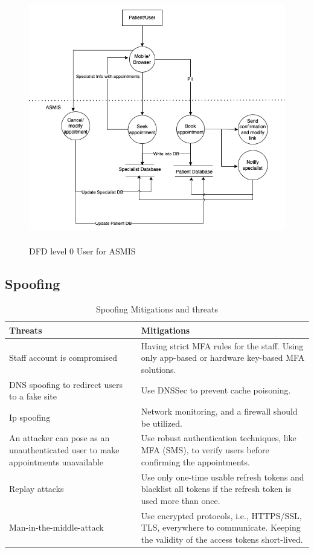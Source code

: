 \begin{figure}[h!]
\centering
\includegraphics[width=12cm, height=11cm]{pics/dfd_user.png}
\caption{DFD level 0 User for ASMIS}\label{fig:dfd_user}
\end{figure}


\subsection{Spoofing}
\begingroup
\centering
\setlength{\tabcolsep}{6.5pt} %
\renewcommand{\arraystretch}{1.8} %
\begin{longtable}{ |p{7cm}| p{8cm} |}
\caption{Spoofing Mitigations and threats}
    \label{table:spoofing}
\hline
\textbf{Threats} & \textbf{Mitigations}\\
\hline
Staff account is compromised & Having strict MFA rules for the staff.\newline 
Using only app-based or hardware key-based MFA solutions. \\
\hline
DNS spoofing to redirect users to a fake site & Use DNSSec to prevent cache poisoning. \\
\hline
Ip spoofing & Network monitoring, and a firewall should be utilized.\\
\hline
An attacker can pose as an unauthenticated user to make appointments unavailable & Use robust authentication techniques, like MFA (SMS), to verify users before confirming the appointments.\\
\hline
Replay attacks & Use only one-time usable refresh tokens and blacklist all tokens if the refresh token is used more than once.\\
\hline
Man-in-the-middle-attack & Use encrypted protocols, i.e., HTTPS/SSL, TLS, everywhere to communicate.\newline
Keeping the validity of the access tokens short-lived. \\
\hline
\end{longtable}
\endgroup

